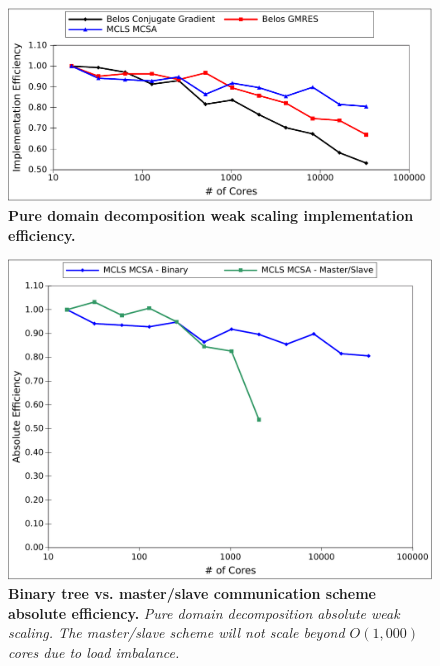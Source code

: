 \begin{figure}[htpb!]
  \begin{center}
    \includegraphics[width=6in]{chapters/parallel_mc/titan_weak_implementation.pdf}
  \end{center}
  \caption{\textbf{Pure domain decomposition weak scaling
      implementation efficiency.}}
  \label{fig:titan_weak_implementation}
\end{figure}

\begin{figure}[htpb!]
  \begin{center}
    \includegraphics[width=6in]{chapters/parallel_mc/titan_weak_bvsm.pdf}
  \end{center}
  \caption{\textbf{Binary tree vs. master/slave communication scheme
      absolute efficiency.}  \textit{Pure domain decomposition
      absolute weak scaling. The master/slave scheme will not scale
      beyond $O(1,000)$ cores due to load imbalance.}}
  \label{fig:titan_weak_bvsm}
\end{figure}

